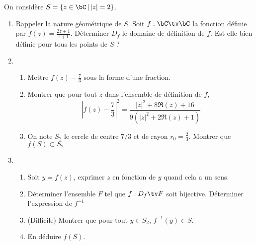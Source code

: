 \documentclass[a4paper, 11pt,reqno]{article}
\begin{document}
\begin{exercice}
On considère $ S= \{ z\in \bC\, | \, |z|=2\}$.
\begin{enumerate}
\item Rappeler la nature géométrique de $S$.
Soit $f : \bC \tv \bC $ la fonction définie par $f(z) =\frac{2z +1}{z+1}$. Déterminer $D_f$ le domaine de définition de $f$. Est elle bien définie pour tous les points de $S$ ? 
\item 
\begin{enumerate}
\item Mettre $f(z) -\frac{7}{3}$ sous la forme d'une fraction. 
\item Montrer que pour tout $z$ dans l'ensemble de définition de $f$, $$\left| f(z) -\frac{7}{3}\right|^2 = \frac{|z|^2 +8\Re(z) +16 }{9 (|z|^2 +2\Re(z) +1)}$$
\item On note $S_2$ le cercle de centre $7/3$ et de rayon $r_0 =\frac{2}{3}$. Montrer que $f(S) \subset S_2$
\end{enumerate}
\item
\begin{enumerate}
\item  Soit $y =f(z)$, exprimer $z$ en fonction de $y$ quand cela a un sens. 
\item Déterminer l'ensemble $F$ tel que $f : D_f \tv F$ soit bijective. Déterminer l'expression de $f^{-1}$ 
\item (Difficile) Montrer que pour tout $y\in S_2$, $f^{-1}(y) \in S$. 
\item En déduire $f(S).$ 
\end{enumerate}

\end{enumerate}
\end{exercice}
\end{document}
